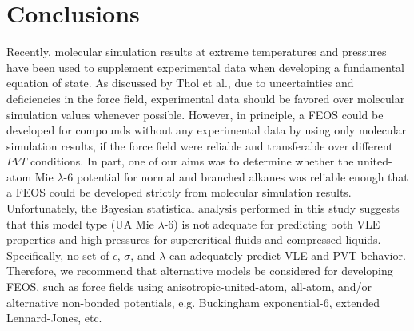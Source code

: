\documentclass[journal=jctc,manuscript=article]{achemso}
\begin{document}
\section{Conclusions} \label{Conclusions}

Recently, molecular simulation results at extreme temperatures and pressures have been used to supplement experimental data when developing a fundamental equation of state. As discussed by Thol et al., due to uncertainties and deficiencies in the force field, experimental data should be favored over molecular simulation values whenever possible. However, in principle, a FEOS could be developed for compounds without any experimental data by using only molecular simulation results, if the force field were reliable and transferable over different $PVT$ conditions. In part, one of our aims was to determine whether the united-atom Mie $\lambda$-6 potential for normal and branched alkanes was reliable enough that a FEOS could be developed strictly from molecular simulation results. Unfortunately, the Bayesian statistical analysis performed in this study suggests that this model type (UA Mie $\lambda$-6) is not adequate for predicting both VLE properties and high pressures for supercritical fluids and compressed liquids. Specifically, no set of $\epsilon$, $\sigma$, and $\lambda$ can adequately predict VLE and PVT behavior. Therefore, we recommend that alternative models be considered for developing FEOS, such as force fields using anisotropic-united-atom, all-atom, and/or alternative non-bonded potentials, e.g. Buckingham exponential-6, extended Lennard-Jones, etc.

%

\end{document}

